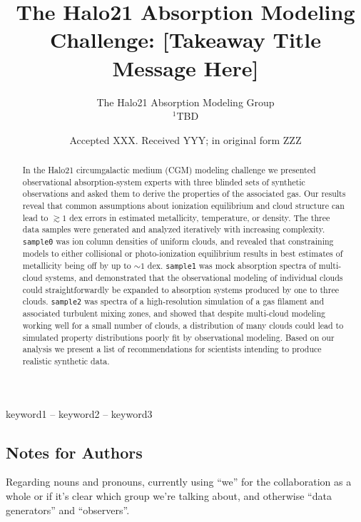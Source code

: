 \documentclass[fleqn,usenatbib]{mnras}
\title[Halo21 CGM Modeling Challenge]{The Halo21 Absorption Modeling Challenge: [Takeaway Title Message Here]}
\author[]{
The Halo21 Absorption Modeling Group
\\
$^{1}$TBD\\
}
\date{Accepted XXX. Received YYY; in original form ZZZ}
\begin{document}
\label{firstpage}
\pagerange{\pageref{firstpage}--\pageref{lastpage}}
\maketitle

\begin{abstract}
In the Halo21 circumgalactic medium (CGM) modeling challenge we presented observational absorption-system experts with three blinded sets of synthetic observations and asked them to derive the properties of the associated gas.
Our results reveal that common assumptions about ionization equilibrium and cloud structure can lead to $\gtrsim 1$ dex errors in estimated metallicity, temperature, or density.
The three data samples were generated and analyzed iteratively with increasing complexity.
\texttt{sample0} was ion column densities of uniform clouds, and revealed that constraining models to either collisional or photo-ionization equilibrium results in best estimates of metallicity being off by up to $\sim 1$ dex.
\texttt{sample1} was mock absorption spectra of multi-cloud systems, and demonstrated that the observational modeling of individual clouds could straightforwardly be expanded to absorption systems produced by one to three clouds.
\texttt{sample2} was spectra of a high-resolution simulation of a gas filament and associated turbulent mixing zones, and showed that despite multi-cloud modeling working well for a small number of clouds, a distribution of many clouds could lead to simulated property distributions poorly fit by observational modeling.
Based on our analysis we present a list of recommendations for scientists intending to produce realistic synthetic data.
\end{abstract}

\begin{keywords}
keyword1 -- keyword2 -- keyword3
\end{keywords}



\subsection{Notes for Authors}

Regarding nouns and pronouns, currently using ``we'' for the collaboration as a whole or if it's clear which group we're talking about, and otherwise ``data generators'' and ``observers''. 
\end{document}

